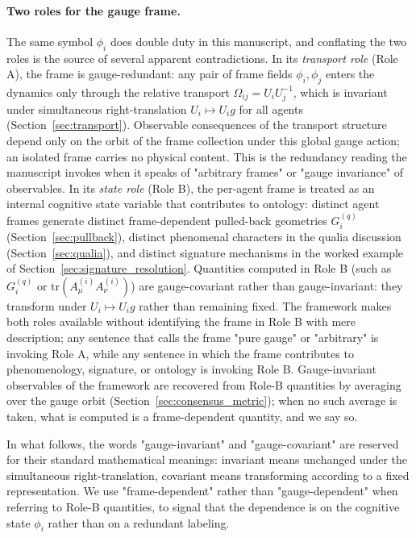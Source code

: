 \documentclass[11pt]{article}
\begin{document}
\paragraph{Two roles for the gauge frame.} The same symbol $\phi_i$ does double duty in this manuscript, and conflating the two roles is the source of several apparent contradictions. In its \emph{transport role} (Role A), the frame is gauge-redundant: any pair of frame fields $\phi_i, \phi_j$ enters the dynamics only through the relative transport $\Omega_{ij} = U_iU_j^{-1}$, which is invariant under simultaneous right-translation $U_i \mapsto U_i g$ for all agents (Section~\ref{sec:transport}). Observable consequences of the transport structure depend only on the orbit of the frame collection under this global gauge action; an isolated frame carries no physical content. This is the redundancy reading the manuscript invokes when it speaks of "arbitrary frames" or "gauge invariance" of observables. In its \emph{state role} (Role B), the per-agent frame is treated as an internal cognitive state variable that contributes to ontology: distinct agent frames generate distinct frame-dependent pulled-back geometries $G_i^{(q)}$ (Section~\ref{sec:pullback}), distinct phenomenal characters in the qualia discussion (Section~\ref{sec:qualia}), and distinct signature mechanisms in the worked example of Section~\ref{sec:signature_resolution}. Quantities computed in Role B (such as $G_i^{(q)}$ or $\mathrm{tr}(A^{(i)}_\mu A^{(i)}_\nu)$) are gauge-covariant rather than gauge-invariant: they transform under $U_i \mapsto U_i g$ rather than remaining fixed. The framework makes both roles available without identifying the frame in Role B with mere description; any sentence that calls the frame "pure gauge" or "arbitrary" is invoking Role A, while any sentence in which the frame contributes to phenomenology, signature, or ontology is invoking Role B. Gauge-invariant observables of the framework are recovered from Role-B quantities by averaging over the gauge orbit (Section~\ref{sec:consensus_metric}); when no such average is taken, what is computed is a frame-dependent quantity, and we say so.

In what follows, the words "gauge-invariant" and "gauge-covariant" are reserved for their standard mathematical meanings: invariant means unchanged under the simultaneous right-translation, covariant means transforming according to a fixed representation. We use "frame-dependent" rather than "gauge-dependent" when referring to Role-B quantities, to signal that the dependence is on the cognitive state $\phi_i$ rather than on a redundant labeling.
\end{document}
